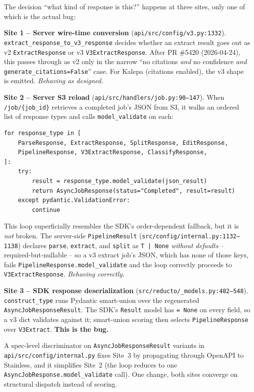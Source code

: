 \documentclass[11pt]{article}
\begin{document}
The decision ``what kind of response is this?'' happens at three sites, only one of which is the actual bug:

\textbf{Site 1 -- Server wire-time conversion} (\texttt{api/src/config/v3.py:1332}). \texttt{extract\_response\_to\_v3\_response} decides whether an extract result goes out as v2 \texttt{ExtractResponse} or v3 \texttt{V3ExtractResponse}. After PR \#5420 (2026-04-24), this passes through as v2 only in the narrow ``no citations \emph{and} no confidence \emph{and} \texttt{generate\_citations=False}'' case. For Kalepa (citations enabled), the v3 shape is emitted. \emph{Behaving as designed.}

\textbf{Site 2 -- Server S3 reload} (\texttt{api/src/handlers/job.py:90--147}). When \texttt{/job/\{job\_id\}} retrieves a completed job's JSON from S3, it walks an ordered list of response types and calls \texttt{model\_validate} on each:

\begin{lstlisting}[style=py]
for response_type in [
    ParseResponse, ExtractResponse, SplitResponse, EditResponse,
    PipelineResponse, V3ExtractResponse, ClassifyResponse,
]:
    try:
        result = response_type.model_validate(json_result)
        return AsyncJobResponse(status="Completed", result=result)
    except pydantic.ValidationError:
        continue
\end{lstlisting}

This loop superficially resembles the SDK's order-dependent fallback, but it is \emph{not} broken. The server-side \texttt{PipelineResult} (\texttt{src/config/internal.py:1132--1138}) declares \texttt{parse}, \texttt{extract}, and \texttt{split} as \texttt{T | None} \emph{without defaults} -- required-but-nullable -- so a v3 extract job's JSON, which has none of those keys, fails \texttt{PipelineResponse.model\_validate} and the loop correctly proceeds to \texttt{V3ExtractResponse}. \emph{Behaving correctly.}

\textbf{Site 3 -- SDK response deserialization} (\texttt{src/reducto/\_models.py:482--548}). \texttt{construct\_type} runs Pydantic smart-union over the regenerated \texttt{AsyncJobResponseResult}. The SDK's \texttt{Result} model has \texttt{= None} on every field, so a v3 dict validates against it; smart-union scoring then selects \texttt{PipelineResponse} over \texttt{V3Extract}. \textbf{This is the bug.}

A spec-level discriminator on \texttt{AsyncJobResponseResult} variants in \texttt{api/src/config/internal.py} fixes Site~3 by propagating through OpenAPI to Stainless, and it simplifies Site~2 (the loop reduces to one \texttt{AsyncJobResponse.model\_validate} call). One change, both sites converge on structural dispatch instead of scoring.
\end{document}
